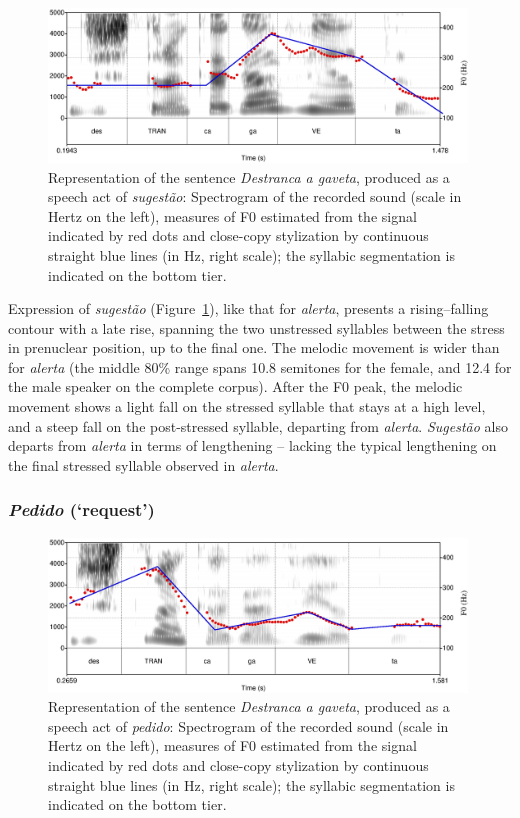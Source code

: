 \documentclass[output=paper]{LSP/langsci}
\begin{document}
\begin{figure}

\includegraphics[width=0.99\textwidth]{figures/MOR8.eps}
\caption{Representation of the sentence \textit{Destranca a gaveta}, produced as a speech act of \textit{sugestão}: Spectrogram of the recorded sound (scale in Hertz on the left), measures of F0 estimated from the signal indicated by red dots and close-copy stylization by continuous straight blue lines (in Hz, right scale); the syllabic segmentation is indicated on the bottom tier.}
\label{figure:CC6}
\end{figure}

Expression of \textit{sugestão} (Figure~\ref{figure:CC6}), like that for \textit{alerta}, presents a rising–falling contour with a late rise, spanning the two unstressed syllables between the stress in prenuclear position, up to the final one. 
The melodic movement is wider than for \textit{alerta} (the middle 80\% range spans 10.8 semitones for the female, and 12.4 for the male speaker on the complete corpus). 
After the F0 peak, the melodic movement shows a light fall on the stressed syllable that stays at a high level, and a steep fall on the post-stressed syllable, departing from \textit{alerta}. 
\textit{Sugestão} also departs from \textit{alerta} in terms of lengthening -- lacking the typical lengthening  on the final stressed syllable observed in \textit{alerta}.


\subsubsection{\textit{Pedido} (`request')}

\begin{figure}

\includegraphics[width=0.99\textwidth]{figures/MOR9.eps}
\caption{Representation of the sentence \textit{Destranca a gaveta}, produced as a speech act of \textit{pedido}: Spectrogram of the recorded sound (scale in Hertz on the left), measures of F0 estimated from the signal indicated by red dots and close-copy stylization by continuous straight blue lines (in Hz, right scale); the syllabic segmentation is indicated on the bottom tier.}
\label{figure:CC7}
\end{figure}
\end{document}
